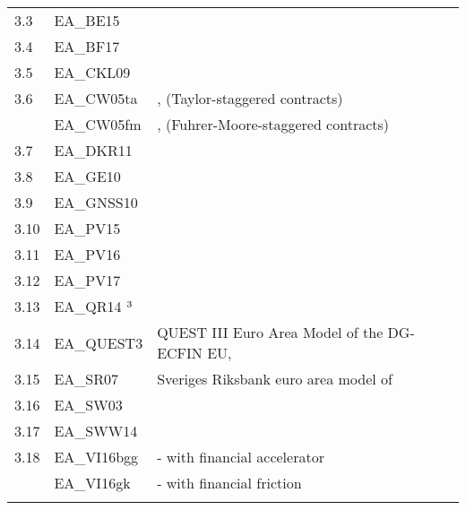 \documentclass[11pt,a4paper]{article}
\begin{document}
\begin{table}[H]
\begin{tabularx}{\textwidth}{lll}
			3.3	&	EA\_BE15	&	\cite{benchimol2015money}	\\										
			3.4	&	EA\_BF17	&	\cite{benchimol2017money}	\\	
			3.5\footnotemark[1]	&	EA\_CKL09	&	\cite{ChristoffelKuesterLinzert2009}\\%
			3.6	&	EA\_CW05ta	&	\cite{CoenenWieland2005},	(Taylor-staggered	contracts)	\\								
			&	EA\_CW05fm	&	\cite{CoenenWieland2005},	(Fuhrer-Moore-staggered	contracts)	\\								
			3.7	&	EA\_DKR11	&	\cite{DarracqPariesetal2011}	\\										
			3.8	&	EA\_GE10	&	\cite{Gelain2010}	\\										
			3.9	&	EA\_GNSS10	&	\cite{Geralietal2010}	\\										
			3.10	&	EA\_PV15	&	\cite{poutineau2015cross}	\\										
			3.11	&	EA\_PV16	&	\cite{priftis2016portfolio}	\\										
			3.12	&	EA\_PV17	&	\cite{priftis2017macroecon}	\\										
			3.13	&	EA\_QR14	$\footnotemark[3]$	&	\cite{QR2014}	\\							
			3.14	&	EA\_QUEST3	&	QUEST	III	Euro	Area	Model	of	the	DG-ECFIN	EU,	\cite{RattoRoegerVeld2009}	\\	
			3.15	&	EA\_SR07	&	Sveriges	Riksbank	euro	area	model	of	\cite{AdolfsonLaseenLindeVillani2007}\\					
			3.16	&	EA\_SW03	&	\cite{SmetsWouters2003}	\\										
			3.17	&	EA\_SWW14	&	\cite{smets2014warne}	\\										
			3.18	&	EA\_VI16bgg	&	\cite{villa2016} - with \cite{BernankeGertlerGilchrist1999} financial accelerator \\										
			&	EA\_VI16gk	&	\cite{villa2016} - with \cite{GertlerKaradi2013} financial friction  \\										

			
			
			
			
			
			\hline \hline
			\vspace{-0.2cm}
		\end{tabularx} 
	\end{table}
\end{document}
